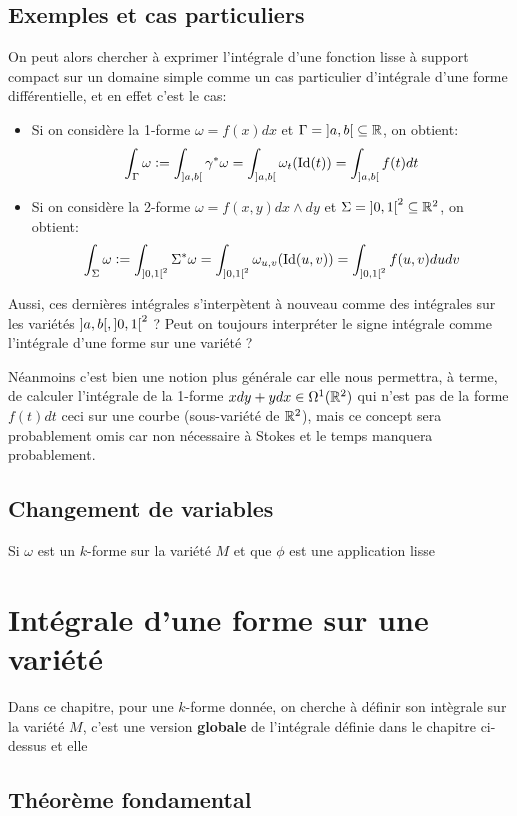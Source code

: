 \section{Exemples et cas particuliers}
On peut alors chercher à exprimer l'intégrale d'une fonction lisse à support compact sur un domaine simple comme un cas particulier d'intégrale d'une forme différentielle, et en effet c'est le cas:
\begin{itemize}
   \item Si on considère la 1-forme \( \omega = f(x)dx \) et \( \Gamma = \ioo{a}{b} \subseteq \R\), on obtient:
   \[ 
      \int_\Gamma \omega := \int_{\ioo{a}{b}}  \gamma^*\omega = \int_{\ioo{a}{b}}  \omega_{t}(\text{Id}(t)) = \int_{\ioo{a}{b}} f(t)dt
   \]
   \item Si on considère la 2-forme \( \omega = f(x, y)dx \wedge dy \) et \( \Sigma = \ioo{0}{1}^2 \subseteq \R^2 \), on obtient:
   \[ 
      \int_\Sigma \omega := \int_{\ioo{0}{1}^2}  \Sigma^*\omega = \int_{\ioo{0}{1}^2}   \omega_{u, v}(\text{Id}(u, v)) = \int_{\ioo{0}{1}^2}  f(u, v)dudv
   \]
\end{itemize}
Aussi, ces dernières intégrales s'interpètent à nouveau comme des intégrales sur les variétés \( \ioo{a}{b}, \ioo{0}{1}^2 \) ? Peut on toujours interpréter le signe intégrale comme l'intégrale d'une forme sur une variété ?\<

Néanmoins c'est bien une notion plus générale car elle nous permettra, à terme, de calculer l'intégrale de la 1-forme \( xdy + ydx \in \Omega^1(\mathbb{R}^2) \) qui n'est pas de la forme \( f(t)dt \) ceci sur une courbe (sous-variété de \( \mathbb{R}^2 \)), mais ce concept sera probablement omis car non nécessaire à Stokes et le temps manquera probablement.
\section{Changement de variables}
Si \( \omega \) est un \( k \)-forme sur la variété \( M \) et que \( \phi \) est une application lisse
\chapter{Intégrale d'une forme sur une variété}
Dans ce chapitre, pour une \( k \)-forme donnée, on cherche à définir son intègrale sur la variété \( M \), c'est une version \textbf{globale} de l'intégrale définie dans le chapitre ci-dessus et elle 
\section{Théorème fondamental}


